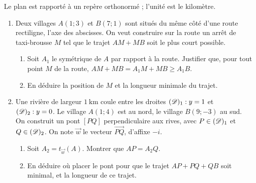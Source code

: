 \begin{exo}\label{exo:isom-plus-court-chemin}
      Le plan est rapporté à un repère orthonormé ; l'unité est le kilomètre.
      \begin{enumerate}
            \item Deux villages $A(1;3)$ et $B(7;1)$ sont situés du même côté d'une route rectiligne, l'axe des abscisses.
                  On veut construire sur la route un arrêt de taxi-brousse $M$ tel que le trajet $AM + MB$ soit le plus court possible.
                  \begin{enumerate}
                        \item Soit $A_1$ le symétrique de $A$ par rapport à la route. Justifier que, pour tout point $M$ de la route,
                              $AM + MB = A_1M + MB \geq A_1 B$.
                        \item En déduire la position de $M$ et la longueur minimale du trajet.
                  \end{enumerate}
            \item Une rivière de largeur $1~\mathrm{km}$ coule entre les droites $(\mathscr{D})_1 : y = 1$ et $(\mathscr{D})_2 : y = 0$.
                  Le village $A(1;4)$ est au nord, le village $B(9;-3)$ au sud. On construit un pont $[PQ]$
                  perpendiculaire aux rives, avec $P \in (\mathscr{D})_1$ et $Q \in (\mathscr{D})_2$. On note $\vec{w}$ le vecteur $\overrightarrow{PQ}$, d'affixe $-i$.
                  \begin{enumerate}
                        \item Soit $A_2 = t_{\vec{w}}(A)$. Montrer que $AP = A_2Q$.
                        \item En déduire où placer le pont pour que le trajet $AP + PQ + QB$ soit minimal, et la longueur de ce trajet.
                  \end{enumerate}
      \end{enumerate}
      \begin{center}
      \end{center}
\end{exo}
